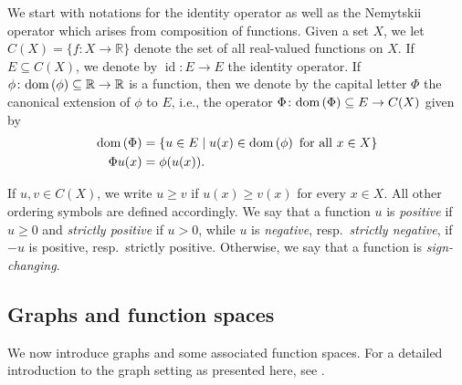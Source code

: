 \documentclass[letterpaper]{article}
\theoremstyle{definition}
\theoremstyle{named}
\numberwithin{equation}{section}
\newcommand{\R}{\mathbb{R}}
\newcommand{\dom}{\textnormal{dom}} %
\begin{document}
We start with notations for the identity operator  as well as the Nemytskii operator which arises from
composition of functions.
Given a set $X$, we let $C(X)=\{ f\colon X \to \R\}$ denote the set
of all real-valued functions on $X$.
If $E\subseteq C(X)$, 
we denote by $\operatorname{id}\colon E \to E$ the identity operator. 
If $\phi \colon \dom\left(\phi\right)\subseteq \R \to \R$ is a function, then we denote by the capital letter $\Phi$ the canonical extension of $\phi$ to $E$, 
i.e., the operator $\Phi \colon \dom\left(\Phi\right)\subseteq E \to C(X)$ 
given by
\begin{align*}
	\dom\left(\Phi\right)&= \left\{ u \in E \mid u(x) \in \dom\left(\phi\right) \textup{ for all } x \in X  \right\}\\
	\Phi u(x)&= \phi(u(x)).
\end{align*}

If $u, v \in C(X)$, we write $u\geq v$ if $u(x)\geq v(x)$ for every $x \in X$. All other ordering symbols are defined accordingly. We say that a function $u$ is \emph{positive} if $u \geq 0$
and \emph{strictly positive} if $u>0$, while $u$ is \emph{negative}, 
resp.~\emph{strictly negative}, if $-u$ is positive, resp.~strictly positive. Otherwise, we say that a function
is \emph{sign-changing}.


\subsection{Graphs and function spaces}
We now introduce graphs and some associated function spaces.
For a detailed introduction to the graph setting as presented here, see \cite{keller2021graphs}.
\end{document}
